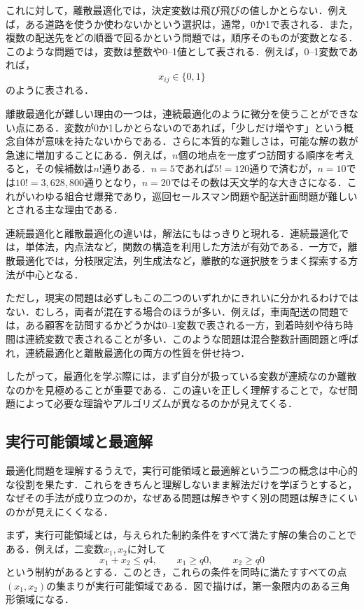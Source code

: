 これに対して，離散最適化では，決定変数は飛び飛びの値しかとらない．例えば，ある道路を使うか使わないかという選択は，通常，0か1で表される．また，複数の配送先をどの順番で回るかという問題では，順序そのものが変数となる．このような問題では，変数は整数や0--1値として表される．例えば，0--1変数であれば，
\begin{equation}
x_{ij}\in \{0,1\}
\end{equation}
のように表される．

離散最適化が難しい理由の一つは，連続最適化のように微分を使うことができない点にある．変数が0か1しかとらないのであれば，「少しだけ増やす」という概念自体が意味を持たないからである．さらに本質的な難しさは，可能な解の数が急速に増加することにある．例えば，$n$個の地点を一度ずつ訪問する順序を考えると，その候補数は$n!$通りある．$n=5$であれば$5!=120$通りで済むが，$n=10$では$10!=3,628,800$通りとなり，$n=20$ではその数は天文学的な大きさになる．これがいわゆる組合せ爆発であり，巡回セールスマン問題や配送計画問題が難しいとされる主な理由である．

連続最適化と離散最適化の違いは，解法にもはっきりと現れる．連続最適化では，単体法，内点法など，関数の構造を利用した方法が有効である．一方で，離散最適化では，分枝限定法，列生成法など，離散的な選択肢をうまく探索する方法が中心となる．

ただし，現実の問題は必ずしもこの二つのいずれかにきれいに分かれるわけではない．むしろ，両者が混在する場合のほうが多い．例えば，車両配送の問題では，ある顧客を訪問するかどうかは0--1変数で表される一方，到着時刻や待ち時間は連続変数で表されることが多い．このような問題は混合整数計画問題と呼ばれ，連続最適化と離散最適化の両方の性質を併せ持つ．

したがって，最適化を学ぶ際には，まず自分が扱っている変数が連続なのか離散なのかを見極めることが重要である．この違いを正しく理解することで，なぜ問題によって必要な理論やアルゴリズムが異なるのかが見えてくる．

\subsection{実行可能領域と最適解}

最適化問題を理解するうえで，実行可能領域と最適解という二つの概念は中心的な役割を果たす．これらをきちんと理解しないまま解法だけを学ぼうとすると，なぜその手法が成り立つのか，なぜある問題は解きやすく別の問題は解きにくいのかが見えにくくなる．

まず，実行可能領域とは，与えられた制約条件をすべて満たす解の集合のことである．例えば，二変数$x_1,x_2$に対して
\begin{equation}
x_1+x_2\le q4,\qquad x_1\ge q0,\qquad x_2\ge q0
\end{equation}
という制約があるとする．このとき，これらの条件を同時に満たすすべての点$(x_1,x_2)$の集まりが実行可能領域である．図で描けば，第一象限内のある三角形領域になる．

